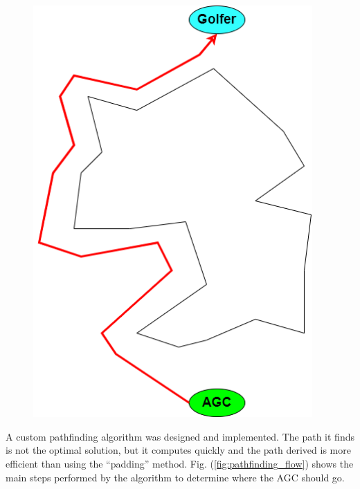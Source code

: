 \documentclass[11pt,landscape]{article}
\begin{document}
\begin{multicols}{3}
\begin{figure}[H]
    \begin{mdframed}
        \begin{center}
            \includegraphics[width=0.95\textwidth]{padding.png}
        \end{center}
    \end{mdframed}
    \label{fig:padding}
\end{figure}

A custom pathfinding algorithm was designed and implemented. The path it finds
is not the optimal solution, but it computes quickly and the path derived is
more efficient than using the ``padding'' method. Fig.
(\ref{fig:pathfinding_flow}) shows the main steps performed by the algorithm to
determine where the AGC should go.


\end{multicols}
\end{document}
